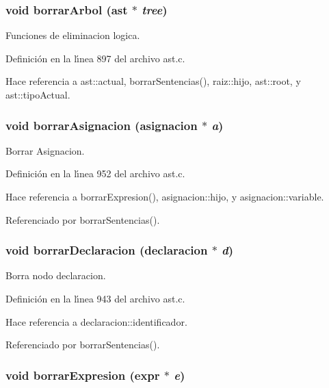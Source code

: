 \subsubsection{\setlength{\rightskip}{0pt plus 5cm}void borrar\-Arbol ({\bf ast} $\ast$ {\em tree})}\label{ast_8c_a44}


Funciones de eliminacion logica. 



Definici\'{o}n en la l\'{\i}nea 897 del archivo ast.c.

Hace referencia a ast::actual, borrar\-Sentencias(), raiz::hijo, ast::root, y ast::tipo\-Actual.
\subsubsection{\setlength{\rightskip}{0pt plus 5cm}void borrar\-Asignacion ({\bf asignacion} $\ast$ {\em a})}\label{ast_8c_a47}


Borrar Asignacion. 



Definici\'{o}n en la l\'{\i}nea 952 del archivo ast.c.

Hace referencia a borrar\-Expresion(), asignacion::hijo, y asignacion::variable.

Referenciado por borrar\-Sentencias().
\subsubsection{\setlength{\rightskip}{0pt plus 5cm}void borrar\-Declaracion ({\bf declaracion} $\ast$ {\em d})}\label{ast_8c_a46}


Borra nodo declaracion. 



Definici\'{o}n en la l\'{\i}nea 943 del archivo ast.c.

Hace referencia a declaracion::identificador.

Referenciado por borrar\-Sentencias().
\subsubsection{\setlength{\rightskip}{0pt plus 5cm}void borrar\-Expresion ({\bf expr} $\ast$ {\em e})}\label{ast_8c_a48}



